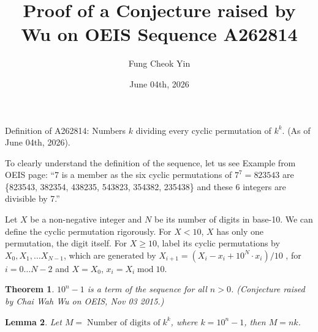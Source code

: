 \documentclass{article}
\newtheorem{thm}{Theorem}
\newtheorem{lem}[thm]{Lemma}
\begin{document}
\title{Proof of a Conjecture raised by Wu on OEIS Sequence A262814}
\author{Fung Cheok Yin}
\date{June 04th, 2026}

\maketitle

Definition of A262814: Numbers $k$ dividing every cyclic permutation of $k^k$. (As of June 04th, 2026).

To clearly understand the definition of the sequence, let us see Example from OEIS page: ``7 is a member as the six cyclic permutations of $7^7 = 823543$ are \{823543, 382354, 438235, 543823, 354382, 235438\} and these 6 integers are divisible by 7.''

Let $X$ be a non-negative integer and $N$ be its number of digits in base-10. We can define the cyclic permutation rigorously. For $X < 10$, $X$ has only one permutation, the digit itself. For $X \ge 10$, label its cyclic permutations by $X_0, X_1, \dots X_{N-1}$, which are generated by $X_{i+1} = (X_i - x_i + 10^N \cdot x_i)/10$ , for $i = 0 \dots N-2$ and $X = X_0$, $x_i = X_i \;\textrm{mod}\; 10$.


\begin{thm}
$10^n-1$ is a term of the sequence for all $n > 0$. (Conjecture raised by Chai Wah Wu on OEIS, Nov 03 2015.)
\end{thm}

\begin{lem}
Let $M = \;\textrm{Number of digits of}\; k^k$, where $k = 10^n-1$, then $M=nk$.
\end{lem}
\end{document}
